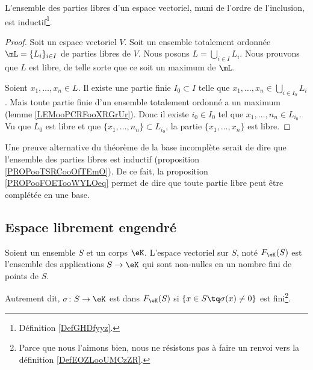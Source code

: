 \begin{proposition}	\label{PROPooTSRCooOfTEmO}
	L'ensemble des parties libres d'un espace vectoriel, muni de l'ordre de l'inclusion, est inductif\footnote{Définition \ref{DefGHDfyyz}.}.
\end{proposition}

\begin{proof}
	Soit un espace vectoriel \( V\). Soit un ensemble totalement ordonnée \( \mL=\{ L_i \}_{i\in I}\) de parties libres de \( V\). Nous posons \( L=\bigcup_{i\in I}L_i\). Nous prouvons que \( L\) est libre, de telle sorte que ce soit un maximum de \( \mL\).

	Soient \( x_1,\ldots,x_n\in L\). Il existe une partie finie \( I_0\subset I\) telle que \( x_1,\ldots,x_n\in \bigcup_{i\in I_0}L_i\). Mais toute partie finie d'un ensemble totalement ordonné a un maximum (lemme \ref{LEMooPCRFooXRGrUr}). Donc il existe \( i_0\in I_0\)  tel que \( x_1,\ldots,n_n\in L_{i_0}\). Vu que \( L_{0}\) est libre et que \( \{ x_1,\ldots,n_n \}\subset L_{i_0}\), la partie \( \{ x_1,\ldots,x_n \}\) est libre.
\end{proof}

\begin{normaltext}        \label{NORMooREVQooEFJWta}
	Une preuve alternative du théorème de la base incomplète serait de dire que l'ensemble des parties libres est inductif (proposition \ref{PROPooTSRCooOfTEmO}). De ce fait, la proposition \ref{PROPooFOETooWYLOeq} permet de dire que toute partie libre peut être complétée en une base.
\end{normaltext}

\subsection{Espace librement engendré}

\begin{definition}       \label{DEFooCPNIooNxsYMY}
	Soient un ensemble \( S\) et un corps \(\eK \). L'espace vectoriel  sur \( S\), noté \( F_{\eK}(S)\) est l'ensemble des applications \( S\to \eK\) qui sont non-nulles en un nombre fini de points de \( S\).

	Autrement dit, \( \sigma\colon S\to \eK\) est dans \( F_{\eK}(S) \) si \( \{ x\in S\tq \sigma(x)\neq 0 \}\) est fini\footnote{Parce que nous l'aimons bien, nous ne résistons pas à faire un renvoi vers la définition \ref{DefEOZLooUMCzZR}.}.
\end{definition}

